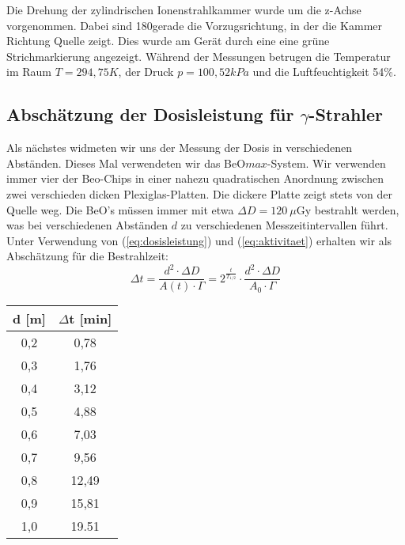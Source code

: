 Die Drehung der zylindrischen Ionenstrahlkammer wurde um die z-Achse vorgenommen. Dabei sind 180\textdegree gerade die Vorzugsrichtung, in der die Kammer Richtung Quelle zeigt. Dies wurde am Gerät durch eine eine grüne Strichmarkierung angezeigt. Während der Messungen betrugen die Temperatur im Raum $T = 294,75K$, der Druck $p = 100,52kPa$ und die Luftfeuchtigkeit 54\%.

\subsection{Abschätzung der Dosisleistung für $\gamma$-Strahler}

Als nächstes widmeten wir uns der Messung der Dosis in verschiedenen Abständen. Dieses Mal verwendeten wir das BeO$max$-System. Wir verwenden immer vier der Beo-Chips in einer nahezu quadratischen Anordnung zwischen zwei verschieden dicken Plexiglas-Platten. Die dickere Platte zeigt stets von der Quelle weg.
Die BeO's müssen immer mit etwa $\Delta D = 120\ \mu$Gy bestrahlt werden, was bei verschiedenen Abständen $d$ zu verschiedenen Messzeitintervallen führt. Unter Verwendung von (\ref{eq:dosisleistung}) und (\ref{eq:aktivitaet}) erhalten wir als Abschätzung für die Bestrahlzeit:
\begin{equation}
		\Delta t 	= \frac{d^2 \cdot \Delta D}{A(t) \cdot \Gamma} 
					= 2^{\frac{t}{T_{1/2}}} \cdot \frac{d^2 \cdot \Delta D}{A_0 \cdot \Gamma} 
\end{equation}

\vspace{5mm}
\minipanf
	\begin{center}
		\begin{tabular}{c|c}
				   \textbf{d} [m] & \textbf{$\Delta$t} [min] \\ 
		\hline     0,2 &  0,78 \\ 
				   0,3 &  1,76 \\ 
				   0,4 &  3,12 \\ 
				   0,5 &  4,88 \\ 
				   0,6 &  7,03 \\ 
				   0,7 &  9,56 \\ 
				   0,8 & 12,49 \\ 
				   0,9 & 15,81 \\ 
				   1,0 & 19.51 \\  
		\end{tabular}
		\label{dft:Zeiten} 
	\end{center}
\minipend
\vspace{5mm}

